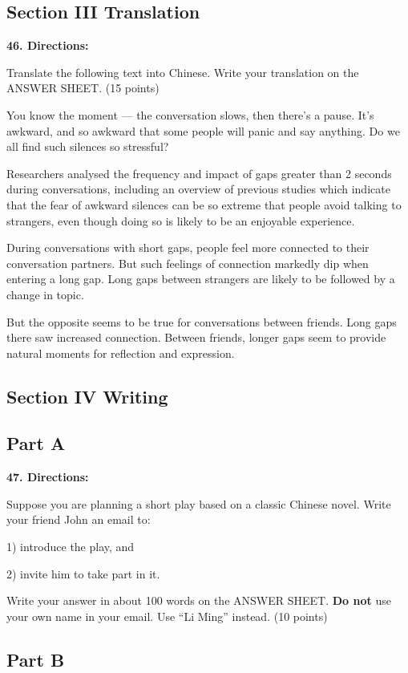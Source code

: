 \documentclass[UTF8,11pt]{ctexart}
\begin{document}
\subsection*{\textbf{Section III Translation}}


\textbf{46. Directions:}


Translate the following text into Chinese. Write your translation on the ANSWER SHEET. (15 points)


You know the moment — the conversation slows, then there’s a pause. It’s awkward, and so awkward that some people will panic and say anything. Do we all find such silences so stressful?


Researchers analysed the frequency and impact of gaps greater than 2 seconds during conversations, including an overview of previous studies which indicate that the fear of awkward silences can be so extreme that people avoid talking to strangers, even though doing so is likely to be an enjoyable experience.


During conversations with short gaps, people feel more connected to their conversation partners. But such feelings of connection markedly dip when entering a long gap. Long gaps between strangers are likely to be followed by a change in topic.


But the opposite seems to be true for conversations between friends. Long gaps there saw increased connection. Between friends, longer gaps seem to provide natural moments for reflection and expression.


\subsection*{\textbf{Section IV Writing}}


\subsection*{\textbf{Part A}}


\textbf{47. Directions:}


Suppose you are planning a short play based on a classic Chinese novel. Write your friend John an email to:


1) introduce the play, and


2) invite him to take part in it.


Write your answer in about 100 words on the ANSWER SHEET. \textbf{Do not} use your own name in your email. Use “Li Ming” instead. (10 points)


\subsection*{\textbf{Part B}}
\end{document}
